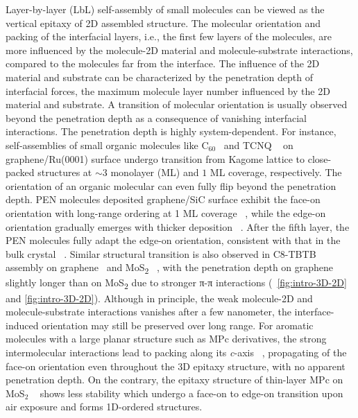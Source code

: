 Layer-by-layer (LbL) self-assembly of small molecules can be viewed as
the vertical epitaxy of 2D assembled structure. The molecular
orientation and packing of the interfacial layers, i.e., the first few
layers of the molecules, are more influenced by the molecule-2D
material and molecule-substrate interactions, compared to the
molecules far from the interface. The influence of the 2D material and
substrate can be  characterized by the penetration depth of interfacial forces, \ie the
maximum molecule layer number influenced by the 2D material and
substrate.
%
A transition of
molecular orientation is usually observed beyond the penetration depth
as a consequence of vanishing interfacial interactions.
%
The penetration depth is highly system-dependent.
%
For instance, self-assemblies of small organic molecules like
C\(_{\text{60}}\)~\autocite{Lu_2012_c60_gr_moire} and TCNQ
~\autocite{Maccariello_2014_TCNQ_gr_Ru} on graphene/\allowbreak{}Ru(0001) surface undergo
transition from Kagome lattice to close-packed structures at $\sim$3
monolayer (ML) and $1$ ML coverage, respectively.
%
The orientation of an organic molecular can even fully flip beyond the
penetration depth. PEN molecules deposited graphene/SiC surface
exhibit the face-on orientation with long-range ordering at 1 ML
coverage ~\autocite{Jung_2014_pentacene}, while the edge-on orientation
gradually emerges with thicker deposition
~\autocite{Chen_2008_transition_pentacene}. After the fifth layer, the PEN
molecules fully adapt the edge-on orientation, consistent with that in
the bulk crystal ~\autocite{Ruiz_2004_bulk_pentacene}. Similar structural
transition is also observed in C8-TBTB assembly on
graphene~\autocite{He_2014_C8BTBT_gr} and MoS\textsubscript{2}
~\autocite{He_2015_C8BTBT_MoS2}, with the penetration depth on graphene
slightly longer than on MoS\textsubscript{2} due to stronger π-π
interactions (~\autoref{fig:intro-3D-2D} and
\autoref{fig:intro-3D-2D}).
%
Although in principle, the weak molecule-2D and molecule-substrate
interactions vanishes after a few nano\-meter, the interface-induced orientation may still be preserved over long range.
For aromatic molecules with a large planar structure
such as MPc derivatives, the strong intermolecular interactions lead
to packing along its \textit{c}-axis
~\autocite{Ren_2011_DFT_CuPc_epi_gr,Jiang_2014_F16Pc,Yoon_2010_crystal_F16cuPc},
propagating of the face-on orientation even
throughout the 3D epitaxy structure, with no apparent penetration
depth. On the contrary, the epitaxy
structure of thin-layer MPc on MoS\(_{\text{2}}\)
~\autocite{Zhang_2015_CuPc_MoS2} shows less stability which undergo a
face-on to edge-on transition upon air exposure and forms 1D-ordered
structures.

